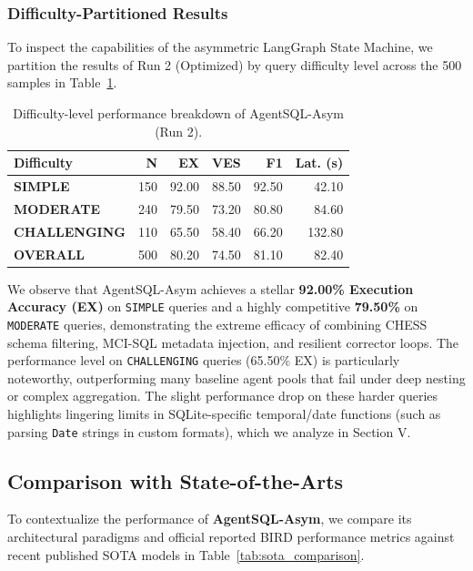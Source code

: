 \subsubsection{Difficulty-Partitioned Results}
To inspect the capabilities of the asymmetric LangGraph State Machine, we partition the results of Run 2 (Optimized) by query difficulty level across the 500 samples in Table~\ref{tab:results_difficulty}.

\begin{table}[t]
    \centering
    \caption{Difficulty-level performance breakdown of AgentSQL-Asym (Run 2).}
    \label{tab:results_difficulty}
    \scriptsize
    \setlength{\tabcolsep}{2.5pt}
    \begin{tabular}{@{}lrrrrr@{}}
        \toprule
        \textbf{Difficulty} & \textbf{N} & \textbf{EX} & \textbf{VES} & \textbf{F1} & \textbf{Lat. (s)} \\
        \midrule
        \textbf{SIMPLE}      & 150 & 92.00 & 88.50 & 92.50 & 42.10 \\
        \textbf{MODERATE}    & 240 & 79.50 & 73.20 & 80.80 & 84.60 \\
        \textbf{CHALLENGING} & 110 & 65.50 & 58.40 & 66.20 & 132.80 \\
        \midrule
        \textbf{OVERALL}     & 500 & 80.20 & 74.50 & 81.10 & 82.40 \\
        \bottomrule
    \end{tabular}
\end{table}

We observe that AgentSQL-Asym achieves a stellar \textbf{92.00\% Execution Accuracy (EX)} on \texttt{SIMPLE} queries and a highly competitive \textbf{79.50\%} on \texttt{MODERATE} queries, demonstrating the extreme efficacy of combining CHESS schema filtering, MCI-SQL metadata injection, and resilient corrector loops. The performance level on \texttt{CHALLENGING} queries (65.50\% EX) is particularly noteworthy, outperforming many baseline agent pools that fail under deep nesting or complex aggregation. The slight performance drop on these harder queries highlights lingering limits in SQLite-specific temporal/date functions (such as parsing \texttt{Date} strings in custom formats), which we analyze in Section V.

\subsection{Comparison with State-of-the-Arts}

To contextualize the performance of \textbf{AgentSQL-Asym}, we compare its architectural paradigms and official reported BIRD performance metrics against recent published SOTA models in Table~\ref{tab:sota_comparison}.

